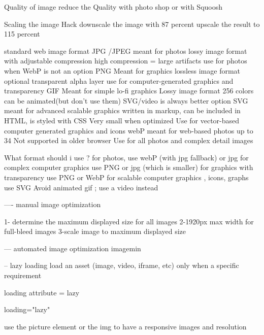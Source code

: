 Quality of image 
  reduce the Quality with photo shop 
  or with Squoosh 

  Scaling the image Hack 
  downscale the image with 87 percent 
  upscale the result to 115 percent 

  standard web image format 
    JPG /JPEG 
      meant for photos 
      lossy image format with adjustable compression 
      high compression = large artifacts
      use for photos when WebP is not an option 
    PNG
      Meant for graphics 
      lossless image format 
      optional transparent alpha layer 
      use for computer-generated graphics and transparency 
    GIF
      Meant for simple lo-fi graphics 
      Lossy image format 
      256 colors 
      can be animated(but don't use them)
      SVG/video is always better option 
    SVG     
      meant for advanced scalable graphics 
      written in markup, can be included in HTML, is styled with CSS 
      Very small when optimized 
      Use for vector-based computer generated graphics and icons
    webP
      meant for web-based photos 
      up to 34%
      Not supported in older browser 
      Use for all photos and complex detail images 


What format should i use ? 
for photos, use webP (with jpg fallback) or jpg 
for complex computer graphics use PNG or jpg (which is smaller)
for graphics with transparency use PNG or WebP
for scalable computer graphics , icons, graphs use SVG 
Avoid animated gif ; use a video instead 

---- manual image optimization 

1- determine the maximum displayed size for all images 
2-1920px max width for full-bleed images
3-scale image to maximum displayed size 

--- automated image optimization 
  imagemin 


-- lazy loading 
load an asset (image, video, iframe, etc) only when a specific requirement 

loading attribute = lazy   

loading="lazy" 

use the picture element or the img to have a responsive images and resolution 

